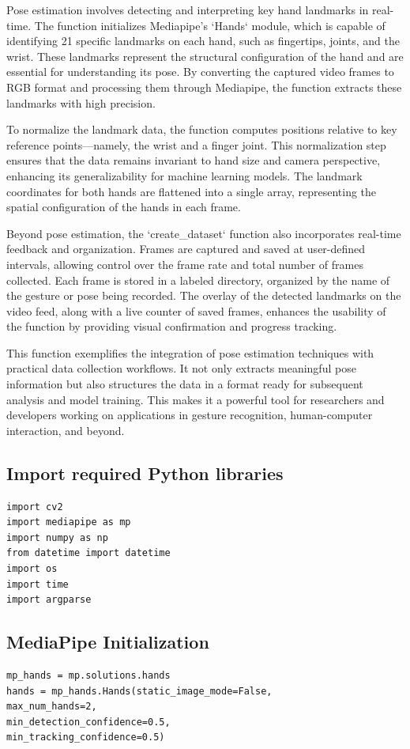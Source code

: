 Pose estimation involves detecting and interpreting key hand landmarks in real-time. The function initializes Mediapipe's `Hands` module, which is capable of identifying 21 specific landmarks on each hand, such as fingertips, joints, and the wrist. These landmarks represent the structural configuration of the hand and are essential for understanding its pose. By converting the captured video frames to RGB format and processing them through Mediapipe, the function extracts these landmarks with high precision.

To normalize the landmark data, the function computes positions relative to key reference points—namely, the wrist and a finger joint. This normalization step ensures that the data remains invariant to hand size and camera perspective, enhancing its generalizability for machine learning models. The landmark coordinates for both hands are flattened into a single array, representing the spatial configuration of the hands in each frame.

Beyond pose estimation, the `create\_dataset` function also incorporates real-time feedback and organization. Frames are captured and saved at user-defined intervals, allowing control over the frame rate and total number of frames collected. Each frame is stored in a labeled directory, organized by the name of the gesture or pose being recorded. The overlay of the detected landmarks on the video feed, along with a live counter of saved frames, enhances the usability of the function by providing visual confirmation and progress tracking.

This function exemplifies the integration of pose estimation techniques with practical data collection workflows. It not only extracts meaningful pose information but also structures the data in a format ready for subsequent analysis and model training. This makes it a powerful tool for researchers and developers working on applications in gesture recognition, human-computer interaction, and beyond.

\subsection{Import required Python libraries}
\begin{lstlisting}
import cv2
import mediapipe as mp
import numpy as np
from datetime import datetime
import os
import time
import argparse
\end{lstlisting}

\subsection{MediaPipe Initialization}
\begin{lstlisting}
mp_hands = mp.solutions.hands
hands = mp_hands.Hands(static_image_mode=False,
max_num_hands=2,
min_detection_confidence=0.5,
min_tracking_confidence=0.5)

\end{lstlisting}

